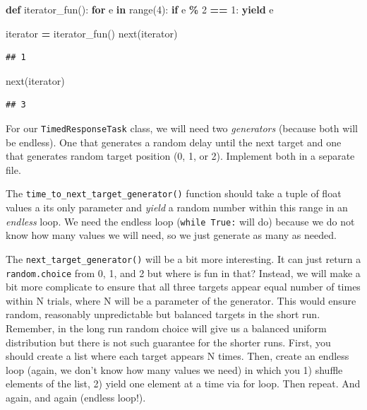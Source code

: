 \documentclass[
]{book}
\newenvironment{Shaded}{\begin{snugshade}}{\end{snugshade}}
\newcommand{\BuiltInTok}[1]{#1}
\newcommand{\ControlFlowTok}[1]{\textcolor[rgb]{0.13,0.29,0.53}{\textbf{#1}}}
\newcommand{\DecValTok}[1]{\textcolor[rgb]{0.00,0.00,0.81}{#1}}
\newcommand{\KeywordTok}[1]{\textcolor[rgb]{0.13,0.29,0.53}{\textbf{#1}}}
\newcommand{\NormalTok}[1]{#1}
\newcommand{\OperatorTok}[1]{\textcolor[rgb]{0.81,0.36,0.00}{\textbf{#1}}}
\begin{document}
\begin{Shaded}
\begin{Highlighting}[]
\KeywordTok{def}\NormalTok{ iterator\_fun():}
  \ControlFlowTok{for}\NormalTok{ e }\KeywordTok{in} \BuiltInTok{range}\NormalTok{(}\DecValTok{4}\NormalTok{):}
    \ControlFlowTok{if}\NormalTok{ e }\OperatorTok{\%} \DecValTok{2} \OperatorTok{==} \DecValTok{1}\NormalTok{:}
      \ControlFlowTok{yield}\NormalTok{ e}

\NormalTok{iterator }\OperatorTok{=}\NormalTok{ iterator\_fun()}
\BuiltInTok{next}\NormalTok{(iterator)}
\end{Highlighting}
\end{Shaded}

\begin{verbatim}
## 1
\end{verbatim}

\begin{Shaded}
\begin{Highlighting}[]
\BuiltInTok{next}\NormalTok{(iterator)}
\end{Highlighting}
\end{Shaded}

\begin{verbatim}
## 3
\end{verbatim}

For our \texttt{TimedResponseTask} class, we will need two \emph{generators} (because both will be endless). One that generates a random delay until the next target and one that generates random target position (0, 1, or 2). Implement both in a separate file.

The \texttt{time\_to\_next\_target\_generator()} function should take a tuple of float values a its only parameter and \emph{yield} a random number within this range in an \emph{endless} loop. We need the endless loop (\texttt{while\ True:} will do) because we do not know how many values we will need, so we just generate as many as needed.

The \texttt{next\_target\_generator()} will be a bit more interesting. It can just return a \texttt{random.choice} from 0, 1, and 2 but where is fun in that? Instead, we will make a bit more complicate to ensure that all three targets appear equal number of times within N trials, where N will be a parameter of the generator. This would ensure random, reasonably unpredictable but balanced targets in the short run. Remember, in the long run random choice will give us a balanced uniform distribution but there is not such guarantee for the shorter runs. First, you should create a list where each target appears N times. Then, create an endless loop (again, we don't know how many values we need) in which you 1) shuffle elements of the list, 2) yield one element at a time via for loop. Then repeat. And again, and again (endless loop!).
\end{document}
